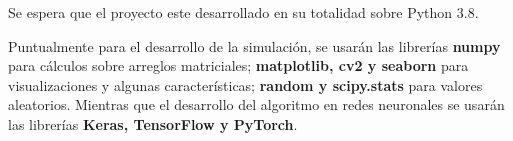 
Se espera que el proyecto este desarrollado en su totalidad sobre Python 3.8.

Puntualmente para el desarrollo de la simulación, se usarán las librerías \textbf{numpy} para cálculos sobre arreglos matriciales; \textbf{matplotlib, cv2 y seaborn} para visualizaciones y algunas características; \textbf{random y scipy.stats} para valores aleatorios. Mientras que el desarrollo del algoritmo en redes neuronales se usarán las librerías \textbf{Keras, TensorFlow y PyTorch}.